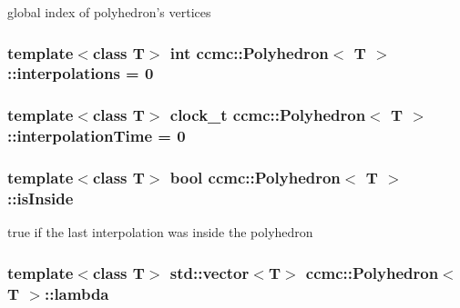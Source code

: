 global index of polyhedron's vertices \hypertarget{classccmc_1_1_polyhedron_a98484d47a61f7fb916e45a4d4c381d08}{
\subsubsection[{interpolations}]{\setlength{\rightskip}{0pt plus 5cm}template$<$class T$>$ int {\bf ccmc\-::\-Polyhedron}$<$ T $>$\-::interpolations = 0\hspace{0.3cm}{\ttfamily [static]}}}\label{classccmc_1_1_polyhedron_a98484d47a61f7fb916e45a4d4c381d08}
\hypertarget{classccmc_1_1_polyhedron_a436708606125ba1059465516aeb2b401}{
\subsubsection[{interpolation\-Time}]{\setlength{\rightskip}{0pt plus 5cm}template$<$class T$>$ clock\-\_\-t {\bf ccmc\-::\-Polyhedron}$<$ T $>$\-::interpolation\-Time = 0\hspace{0.3cm}{\ttfamily [static]}}}\label{classccmc_1_1_polyhedron_a436708606125ba1059465516aeb2b401}
\hypertarget{classccmc_1_1_polyhedron_a54e8c54feeac70b1bd3c1eaf4c237058}{
\subsubsection[{is\-Inside}]{\setlength{\rightskip}{0pt plus 5cm}template$<$class T$>$ bool {\bf ccmc\-::\-Polyhedron}$<$ T $>$\-::is\-Inside}}\label{classccmc_1_1_polyhedron_a54e8c54feeac70b1bd3c1eaf4c237058}
true if the last interpolation was inside the polyhedron \hypertarget{classccmc_1_1_polyhedron_ae398caeb579041f8da9261484deb4eed}{
\subsubsection[{lambda}]{\setlength{\rightskip}{0pt plus 5cm}template$<$class T$>$ std\-::vector$<$T$>$ {\bf ccmc\-::\-Polyhedron}$<$ T $>$\-::lambda}}\label{classccmc_1_1_polyhedron_ae398caeb579041f8da9261484deb4eed}
